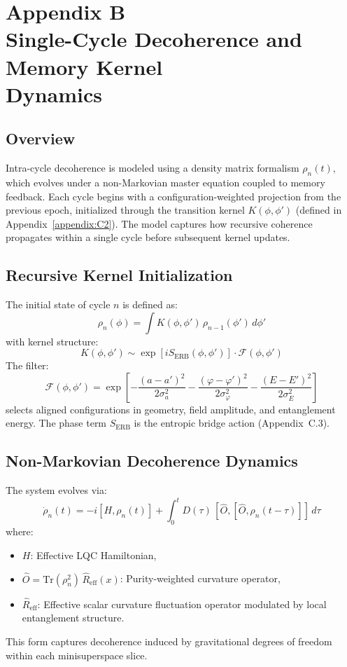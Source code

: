 \section*{Appendix B\\Single-Cycle Decoherence and Memory Kernel\\Dynamics}
\label{appendix:B}

\subsection*{Overview}

Intra-cycle decoherence is modeled using a density matrix formalism \( \rho_n(t) \), which evolves under a non-Markovian master equation coupled to memory feedback. Each cycle begins with a configuration-weighted projection from the previous epoch, initialized through the transition kernel \( K(\phi, \phi') \) (defined in Appendix~\ref{appendix:C2}). The model captures how recursive coherence propagates within a single cycle before subsequent kernel updates.

\subsection*{Recursive Kernel Initialization}

The initial state of cycle \( n \) is defined as:
\[
\rho_n(\phi) = \int K(\phi, \phi') \, \rho_{n-1}(\phi') \, d\phi'
\]
with kernel structure:
\[
K(\phi, \phi') \sim \exp\left[i S_{\text{ERB}}(\phi, \phi')\right] \cdot \mathcal{F}(\phi, \phi')
\]
The filter:
\[
\mathcal{F}(\phi, \phi') = \exp\left[
-\frac{(a - a')^2}{2\sigma_a^2}
-\frac{(\varphi - \varphi')^2}{2\sigma_\varphi^2}
-\frac{(E - E')^2}{2\sigma_E^2}
\right]
\]
selects aligned configurations in geometry, field amplitude, and entanglement energy. The phase term \( S_{\text{ERB}} \) is the entropic bridge action (Appendix~C.3).

\subsection*{Non-Markovian Decoherence Dynamics}

The system evolves via:
\[
\dot{\rho}_n(t) = -i[H, \rho_n(t)] + \int_0^t D(\tau) \, [\hat{O}, [\hat{O}, \rho_n(t - \tau)]] \, d\tau
\]
where:
\begin{itemize}
    \item \( H \): Effective LQC Hamiltonian,
    \item \( \hat{O} = \mathrm{Tr}(\rho_n^2) \, \hat{R}_{\text{eff}}(x) \): Purity-weighted curvature operator,
    \item \( \hat{R}_{\text{eff}} \): Effective scalar curvature fluctuation operator modulated by local entanglement structure.
\end{itemize}
This form captures decoherence induced by gravitational degrees of freedom within each minisuperspace slice.

